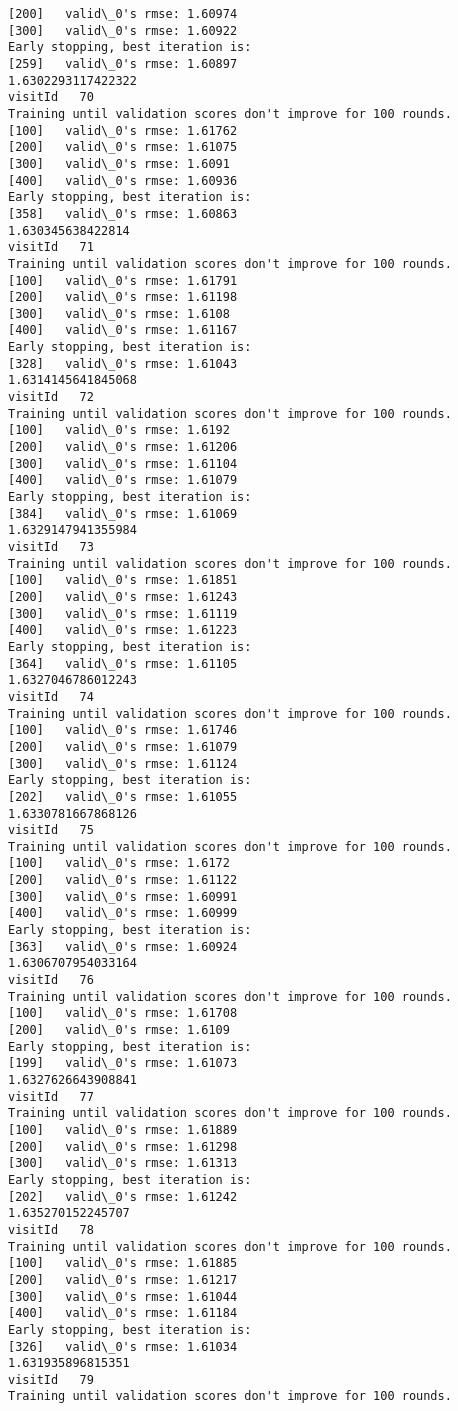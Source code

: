 \documentclass[11pt]{article}
\begin{document}
\begin{Verbatim}[commandchars=\\\{\}]
[200]	valid\_0's rmse: 1.60974
[300]	valid\_0's rmse: 1.60922
Early stopping, best iteration is:
[259]	valid\_0's rmse: 1.60897
1.6302293117422322
visitId   70
Training until validation scores don't improve for 100 rounds.
[100]	valid\_0's rmse: 1.61762
[200]	valid\_0's rmse: 1.61075
[300]	valid\_0's rmse: 1.6091
[400]	valid\_0's rmse: 1.60936
Early stopping, best iteration is:
[358]	valid\_0's rmse: 1.60863
1.630345638422814
visitId   71
Training until validation scores don't improve for 100 rounds.
[100]	valid\_0's rmse: 1.61791
[200]	valid\_0's rmse: 1.61198
[300]	valid\_0's rmse: 1.6108
[400]	valid\_0's rmse: 1.61167
Early stopping, best iteration is:
[328]	valid\_0's rmse: 1.61043
1.6314145641845068
visitId   72
Training until validation scores don't improve for 100 rounds.
[100]	valid\_0's rmse: 1.6192
[200]	valid\_0's rmse: 1.61206
[300]	valid\_0's rmse: 1.61104
[400]	valid\_0's rmse: 1.61079
Early stopping, best iteration is:
[384]	valid\_0's rmse: 1.61069
1.6329147941355984
visitId   73
Training until validation scores don't improve for 100 rounds.
[100]	valid\_0's rmse: 1.61851
[200]	valid\_0's rmse: 1.61243
[300]	valid\_0's rmse: 1.61119
[400]	valid\_0's rmse: 1.61223
Early stopping, best iteration is:
[364]	valid\_0's rmse: 1.61105
1.6327046786012243
visitId   74
Training until validation scores don't improve for 100 rounds.
[100]	valid\_0's rmse: 1.61746
[200]	valid\_0's rmse: 1.61079
[300]	valid\_0's rmse: 1.61124
Early stopping, best iteration is:
[202]	valid\_0's rmse: 1.61055
1.6330781667868126
visitId   75
Training until validation scores don't improve for 100 rounds.
[100]	valid\_0's rmse: 1.6172
[200]	valid\_0's rmse: 1.61122
[300]	valid\_0's rmse: 1.60991
[400]	valid\_0's rmse: 1.60999
Early stopping, best iteration is:
[363]	valid\_0's rmse: 1.60924
1.6306707954033164
visitId   76
Training until validation scores don't improve for 100 rounds.
[100]	valid\_0's rmse: 1.61708
[200]	valid\_0's rmse: 1.6109
Early stopping, best iteration is:
[199]	valid\_0's rmse: 1.61073
1.6327626643908841
visitId   77
Training until validation scores don't improve for 100 rounds.
[100]	valid\_0's rmse: 1.61889
[200]	valid\_0's rmse: 1.61298
[300]	valid\_0's rmse: 1.61313
Early stopping, best iteration is:
[202]	valid\_0's rmse: 1.61242
1.635270152245707
visitId   78
Training until validation scores don't improve for 100 rounds.
[100]	valid\_0's rmse: 1.61885
[200]	valid\_0's rmse: 1.61217
[300]	valid\_0's rmse: 1.61044
[400]	valid\_0's rmse: 1.61184
Early stopping, best iteration is:
[326]	valid\_0's rmse: 1.61034
1.631935896815351
visitId   79
Training until validation scores don't improve for 100 rounds.

\end{Verbatim}
\end{document}
